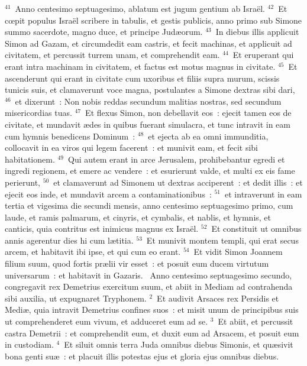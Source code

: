 ${}^{41}$~Anno centesimo septuagesimo, ablatum est jugum gentium ab Isra\"el.
${}^{42}$~Et cœpit populus Isra\"el scribere in tabulis, et gestis publicis, anno primo sub Simone summo sacerdote, magno duce, et principe Jud\ae orum.
${}^{43}$~In diebus illis applicuit Simon ad Gazam, et circumdedit eam castris, et fecit machinas, et applicuit ad civitatem, et percussit turrem unam, et comprehendit eam.
${}^{44}$~Et eruperant qui erant intra machinam in civitatem, et factus est motus magnus in civitate.
${}^{45}$~Et ascenderunt qui erant in civitate cum uxoribus et filiis supra murum, scissis tunicis suis, et clamaverunt voce magna, postulantes a Simone dextras sibi dari,
${}^{46}$~et dixerunt~: Non nobis reddas secundum malitias nostras, sed secundum misericordias tuas.
${}^{47}$~Et flexus Simon, non debellavit eos~: ejecit tamen eos de civitate, et mundavit \ae des in quibus fuerant simulacra, et tunc intravit in eam cum hymnis benedicens Dominum~:
${}^{48}$~et ejecta ab ea omni immunditia, collocavit in ea viros qui legem facerent~: et munivit eam, et fecit sibi habitationem.
${}^{49}$~Qui autem erant in arce Jerusalem, prohibebantur egredi et ingredi regionem, et emere ac vendere~: et esurierunt valde, et multi ex eis fame perierunt,
${}^{50}$~et clamaverunt ad Simonem ut dextras acciperent~: et dedit illis~: et ejecit eos inde, et mundavit arcem a contaminationibus~:
${}^{51}$~et intraverunt in eam tertia et vigesima die secundi mensis, anno centesimo septuagesimo primo, cum laude, et ramis palmarum, et cinyris, et cymbalis, et nablis, et hymnis, et canticis, quia contritus est inimicus magnus ex Isra\"el.
${}^{52}$~Et constituit ut omnibus annis agerentur dies hi cum l\ae titia.
${}^{53}$~Et munivit montem templi, qui erat secus arcem, et habitavit ibi ipse, et qui cum eo erant.
${}^{54}$~Et vidit Simon Joannem filium suum, quod fortis pr\ae lii vir esset~: et posuit eum ducem virtutum universarum~: et habitavit in Gazaris.
~Anno centesimo septuagesimo secundo, congregavit rex Demetrius exercitum suum, et abiit in Mediam ad contrahenda sibi auxilia, ut expugnaret Tryphonem.
${}^{2}$~Et audivit Arsaces rex Persidis et Medi\ae , quia intravit Demetrius confines suos~: et misit unum de principibus suis ut comprehenderet eum vivum, et adduceret eum ad se.
${}^{3}$~Et abiit, et percussit castra Demetrii~: et comprehendit eum, et duxit eum ad Arsacem, et posuit eum in custodiam.
${}^{4}$~Et siluit omnis terra Juda omnibus diebus Simonis, et qu\ae sivit bona genti su\ae~: et placuit illis potestas ejus et gloria ejus omnibus diebus.
